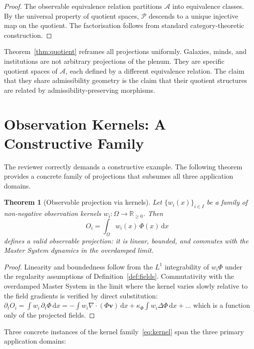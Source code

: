 \documentclass[12pt, oneside]{book}
\theoremstyle{plain}
\newtheorem{theorem}{Theorem}[chapter]
\theoremstyle{definition}
\newcommand{\vfield}{\mathbf{v}}
\newcommand{\dd}{\mathrm{d}}
\newcommand{\nab}{\nabla}
\newcommand{\Adm}{\mathcal{A}}
\begin{document}
\begin{proof}
The observable equivalence relation partitions $\Adm$ into equivalence classes. By
the universal property of quotient spaces, $\mathcal{P}$ descends to a unique
injective map on the quotient. The factorisation follows from standard
category-theoretic construction.
\end{proof}

Theorem~\ref{thm:quotient} reframes all projections uniformly. Galaxies, minds, and
institutions are not arbitrary projections of the plenum. They are specific quotient
spaces of $\Adm$, each defined by a different equivalence relation. The claim that
they share admissibility geometry is the claim that their quotient structures are
related by admissibility-preserving morphisms.

\section{Observation Kernels: A Constructive Family}
\label{sec:kernels}

The reviewer correctly demands a constructive example. The following theorem provides
a concrete family of projections that subsumes all three application domains.

\begin{theorem}[Observable projection via kernels]
\label{thm:kernels}
Let $\{w_i(x)\}_{i \in I}$ be a family of non-negative observation kernels
$w_i: \Omega \to \mathbb{R}_{\geq 0}$. Then
\begin{equation}
  O_i = \int_\Omega w_i(x)\, \Phi(x)\, \dd x
  \label{eq:kernel}
\end{equation}
defines a valid observable projection: it is linear, bounded, and commutes with the
Master System dynamics in the overdamped limit.
\end{theorem}

\begin{proof}
Linearity and boundedness follow from the $L^1$ integrability of $w_i\Phi$ under
the regularity assumptions of Definition~\ref{def:fields}. Commutativity with the
overdamped Master System in the limit where the kernel varies slowly relative to
the field gradients is verified by direct substitution: $\partial_t O_i =
\int w_i\, \partial_t\Phi\, \dd x = -\int w_i \nab\cdot(\Phi\vfield)\, \dd x +
\kappa_\Phi\int w_i\Delta\Phi\, \dd x + \ldots$ which is a function only of the
projected fields.
\end{proof}

Three concrete instances of the kernel family~\eqref{eq:kernel} span the three
primary application domains:
\end{document}
